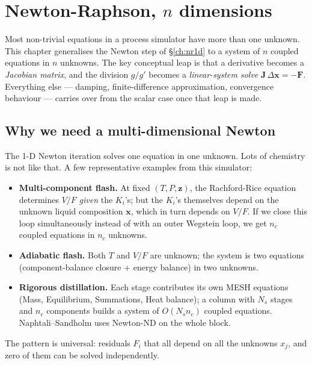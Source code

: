 \documentclass[11pt,a4paper]{article}
\newcommand{\xv}{\mathbf{x}}
\newcommand{\zv}{\mathbf{z}}
\newcommand{\Fv}{\mathbf{F}}
\newcommand{\Jac}{\mathbf{J}}
\begin{document}
\section{Newton-Raphson, \texorpdfstring{$n$}{n} dimensions}\label{ch:nrND}

\begin{whatyoulllearn}
Most non-trivial equations in a process simulator have more than one
unknown.  This chapter generalises the Newton step of \S\ref{ch:nr1d}
to a system of $n$ coupled equations in $n$ unknowns.  The key
conceptual leap is that a derivative becomes a \emph{Jacobian
matrix}, and the division $g/g'$ becomes a \emph{linear-system
solve} $\Jac\,\Delta\xv = -\Fv$.  Everything else --- damping,
finite-difference approximation, convergence behaviour --- carries
over from the scalar case once that leap is made.
\end{whatyoulllearn}

\subsection{Why we need a multi-dimensional Newton}

The 1-D Newton iteration solves one equation in one unknown.  Lots of
chemistry is not like that.  A few representative examples from this
simulator:

\begin{itemize}[leftmargin=*,nosep,topsep=2pt]
  \item \textbf{Multi-component flash.}  At fixed $(T,P,\zv)$, the
        Rachford-Rice equation determines $V/F$ \emph{given} the
        $K_i$'s; but the $K_i$'s themselves depend on the unknown
        liquid composition $\xv$, which in turn depends on $V/F$.
        If we close this loop simultaneously instead of with an outer
        Wegstein loop, we get $n_c$ coupled equations in $n_c$ unknowns.
  \item \textbf{Adiabatic flash.}  Both $T$ and $V/F$ are unknown;
        the system is two equations (component-balance closure +
        energy balance) in two unknowns.
  \item \textbf{Rigorous distillation.}  Each stage contributes its
        own MESH equations (Mass, Equilibrium, Summations,
        Heat balance); a column with $N_s$ stages and $n_c$
        components builds a system of $O(N_s n_c)$ coupled equations.
        Naphtali--Sandholm uses Newton-ND on the whole block.
\end{itemize}
The pattern is universal: residuals $F_i$ that all depend on all the
unknowns $x_j$, and zero of them can be solved independently.
\end{document}
